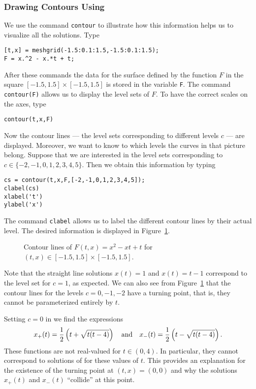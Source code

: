 \documentclass{ximera}
\begin{document}
\subsubsection*{Drawing Contours Using \Matlab}

We use the \Matlab command {\tt contour} to illustrate how this
information helps us to visualize all the solutions.  Type
\begin{verbatim}
[t,x] = meshgrid(-1.5:0.1:1.5,-1.5:0.1:1.5);
F = x.^2 - x.*t + t;
\end{verbatim}
After these commands the data for the surface defined by the
function $F$ in the square $[-1.5,1.5]\times [-1.5,1.5]$ is
stored in the \Matlab variable {\tt F}.  The command {\tt
contour(F)} allows us to display 
the level sets of $F$.  To have
the correct scales on the axes, type
\begin{verbatim}
contour(t,x,F)
\end{verbatim}
Now the contour lines --- the level sets corresponding to
different levels $c$ --- are displayed.  Moreover, we want to know to which 
levels the curves in that picture belong.  Suppose that we are interested in 
the level sets corresponding to $c\in\{ -2,-1,0,1,2,3,4,5\}$.  Then we 
obtain this information by typing
\begin{verbatim}
cs = contour(t,x,F,[-2,-1,0,1,2,3,4,5]);
clabel(cs)
xlabel('t')
ylabel('x')
\end{verbatim}
The command {\tt clabel} allows us to label the different
contour lines by their actual level.  The desired
information is displayed in Figure~\ref{Fig:contour1}.

\begin{figure}[htb]
           \centerline{%
           }
           \caption{Contour lines of $F(t,x)=x^2-xt+t$ for
          $(t,x)\in[-1.5,1.5]\times[-1.5,1.5]$.}
           \label{Fig:contour1}
\end{figure}

Note that the straight line solutions $x(t)=1$ and $x(t)=t-1$ 
correspond to the level set for $c=1$, as expected.  We can also
see from Figure~\ref{Fig:contour1} that the contour lines for
the levels $c=0,-1,-2$ have a turning point, that is, they
cannot be parameterized entirely by $t$.  

Setting $c=0$ in  we find the expressions
\[
x_+(t) = \frac{1}{2}\left(t+\sqrt{t(t-4)}\right) \quad\mbox{and}\quad
x_-(t) = \frac{1}{2}\left(t-\sqrt{t(t-4)}\right).
\]
These functions are not real-valued for $t\in (0,4)$.  In
particular, they cannot correspond to solutions of
 for these values of $t$.  This provides
an explanation for the existence of the turning point at
$(t,x)=(0,0)$ and why the solutions $x_+(t)$ and $x_-(t)$
``collide'' at this point.
\end{document}

